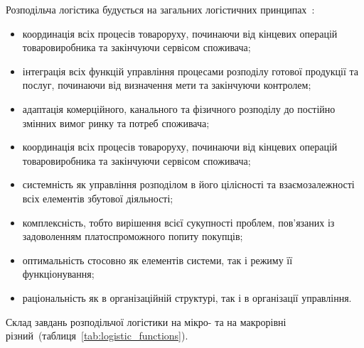 Розподільча логістика будується на загальних логістичних принципах~\cite{Anikin1999}:
\begin{itemize}
	\item координація всіх процесів товароруху, починаючи від кінцевих операцій товаровиробника та закінчуючи сервісом споживача;
	\item інтеграція всіх функцій управління процесами розподілу готової продукції та послуг, починаючи від визначення мети та закінчуючи контролем;
	\item адаптація комерційного, канального та фізичного розподілу до постійно змінних вимог ринку та потреб споживача;
	\item координація всіх процесів товароруху, починаючи від кінцевих операцій товаровиробника та закінчуючи сервісом споживача;
	\item системність як управління розподілом в його цілісності та взаємозалежності всіх елементів збутової діяльності;
	\item комплексність, тобто вирішення всієї сукупності проблем, пов’язаних із задоволенням платоспроможного попиту покупців;
	\item оптимальність стосовно як елементів системи, так і режиму її функціонування;
	\item раціональність як в організаційній структурі, так і в організації управління.
\end{itemize}

Склад завдань розподільчої логістики на мікро- та на макрорівні різний~(таблиця~\ref{tab:logistic_functions}). 

